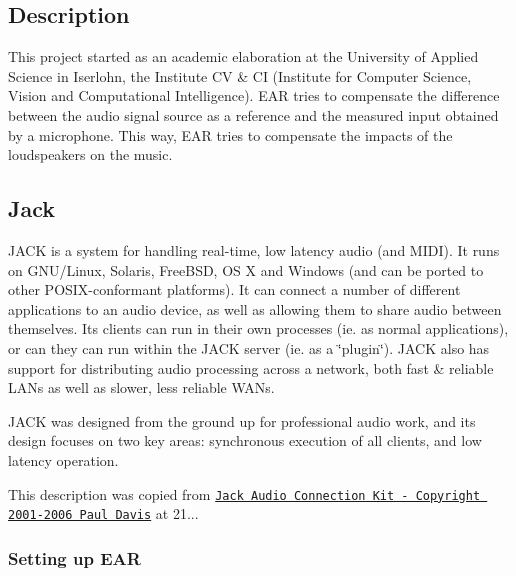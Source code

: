\subsection*{\-Description}

\-This project started as an academic elaboration at the \-University of \-Applied \-Science in \-Iserlohn, the \-Institute \-C\-V \& \-C\-I (\-Institute for \-Computer \-Science, \-Vision and \-Computational \-Intelligence). \-E\-A\-R tries to compensate the difference between the audio signal source as a reference and the measured input obtained by a microphone. \-This way, \-E\-A\-R tries to compensate the impacts of the loudspeakers on the music. \par
 \subsection*{\-Jack}

\-J\-A\-C\-K is a system for handling real-\/time, low latency audio (and \-M\-I\-D\-I). \-It runs on \-G\-N\-U/\-Linux, \-Solaris, \-Free\-B\-S\-D, \-O\-S \-X and \-Windows (and can be ported to other \-P\-O\-S\-I\-X-\/conformant platforms). \-It can connect a number of different applications to an audio device, as well as allowing them to share audio between themselves. \-Its clients can run in their own processes (ie. as normal applications), or can they can run within the \-J\-A\-C\-K server (ie. as a \char`\"{}plugin\char`\"{}). \-J\-A\-C\-K also has support for distributing audio processing across a network, both fast \& reliable \-L\-A\-Ns as well as slower, less reliable \-W\-A\-Ns. \par
 \-J\-A\-C\-K was designed from the ground up for professional audio work, and its design focuses on two key areas\-: synchronous execution of all clients, and low latency operation. \par
 \-This description was copied from \href{http://jackaudio.org/}{\tt \-Jack \-Audio \-Connection \-Kit -\/ \-Copyright 2001-\/2006 \-Paul \-Davis} at 21... \par
 \subsubsection*{\-Setting up \-E\-A\-R}


